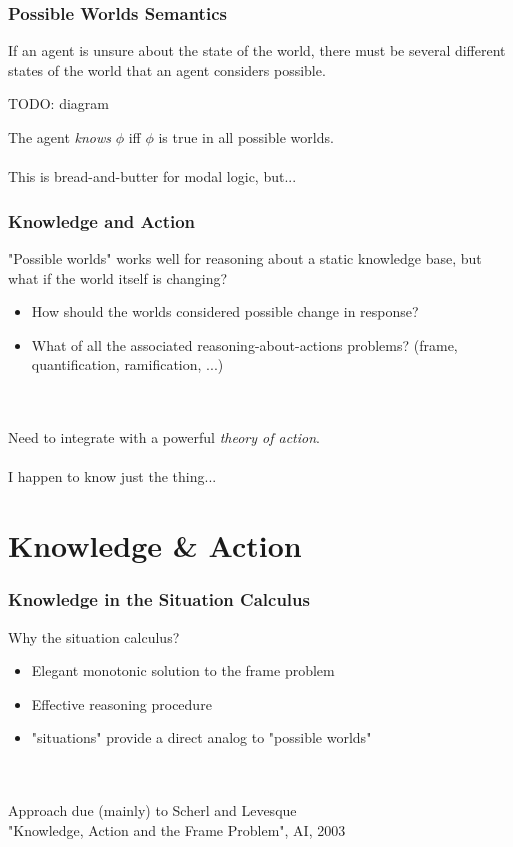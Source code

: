 \documentclass{beamer}
\begin{document}
\begin{frame}
\frametitle{Possible Worlds Semantics}

If an agent is unsure about the state of the world, there must be several
different states of the world that an agent considers possible.

TODO: diagram

The agent \emph{knows} $\phi$ iff $\phi$ is true in all possible worlds.
\ \\
\ \\
This is bread-and-butter for modal logic, but...

\end{frame}

\begin{frame}
\frametitle{Knowledge and Action}
"Possible worlds" works well for reasoning about a static knowledge base,
but what if the world itself is changing?
\begin{itemize}
\item  How should the worlds considered possible change in response?
\item  What of all the associated reasoning-about-actions problems? (frame, quantification, ramification, ...)
\end{itemize}
\ \\
\ \\
Need to integrate with a powerful \emph{theory of action}.
\pause
\ \\
\ \\
I happen to know just the thing...
\end{frame}

\section{Knowledge \& Action}

\begin{frame}
\frametitle{Knowledge in the Situation Calculus}

Why the situation calculus?
\begin{itemize}
\item Elegant monotonic solution to the frame problem
\item Effective reasoning procedure
\item "situations" provide a direct analog to "possible worlds"
\end{itemize}
\ \\
\ \\
Approach due (mainly) to Scherl and Levesque\\
"Knowledge, Action and the Frame Problem", AI, 2003

\end{frame}
\end{document}
